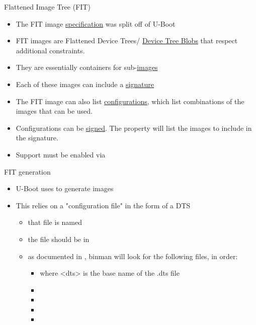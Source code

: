 \begin{frame}{Flattened Image Tree (FIT)}
  \begin{itemize}
    \item The FIT image \href{https://fitspec.osfw.foundation/}{specification} was split off of U-Boot
    \item FIT images are Flattened Device Trees/
          \href{https://devicetree-specification.readthedocs.io/en/stable/flattened-format.html}{Device Tree Blobs}
          that respect additional constraints.
    \item They are essentially containers for sub-\href{https://fitspec.osfw.foundation/\#images-node}{images}
    \item Each of these images can include a
          \href{https://fitspec.osfw.foundation/\#image-signature-nodes}{signature}
    \item The FIT image can also list
          \href{https://fitspec.osfw.foundation/\#configuration-nodes}{configurations},
          which list combinations of the images that can be used.
    \item Configurations can be \href{https://fitspec.osfw.foundation/\#configuration-signature-nodes}{signed}.
          The  property will list the images to include in the signature.
    \item Support must be enabled via 
  \end{itemize}
\end{frame}

\begin{frame}{FIT generation}
  \begin{itemize}
    \item U-Boot uses  to generate images
    \item This relies on a "configuration file" in the form of a DTS
    \begin{itemize}
      \item that file is named 
      \item the file should be in 
      \item as documented in , binman will look for the following
            files, in order:
      \begin{itemize}
      \item {} where <dts> is the base name of the .dts file
      \item \code{<}\code{>}
      \item \code{<}\code{>}
      \item \code{<}\code{>}
      \item {}
      \end{itemize}
    \end{itemize}
  \end{itemize}
\end{frame}

